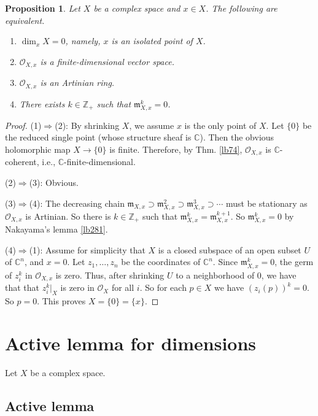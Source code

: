 \documentclass[12pt,b5paper,notitlepage]{report}
\theoremstyle{definition}
\theoremstyle{plain}
\newtheorem{pp}[df]{Proposition}
\newcommand{\scr}{\mathscr}
\newcommand{\Cbb}{\mathbb C}
\newcommand{\Zbb}{\mathbb Z}
\newcommand{\mk}{\mathfrak m}
\numberwithin{equation}{section}
\begin{document}
\begin{pp}\label{lb301}
Let $X$ be a complex space and $x\in X$. The following are equivalent.
\begin{enumerate}[label=(\arabic*)]
\item $\dim_xX=0$, namely, $x$ is an isolated point of $X$.
\item $\scr O_{X,x}$ is a finite-dimensional vector space.
\item $\scr O_{X,x}$ is an Artinian ring.
\item There exists $k\in\Zbb_+$ such that $\mk_{X,x}^k=0$.
\end{enumerate}
\end{pp}


\begin{proof}
(1)$\Rightarrow$(2): By shrinking $X$, we assume $x$ is the only point of $X$. Let $\{0\}$ be the reduced single point (whose structure sheaf is $\Cbb$). Then the obvious holomorphic map $X\rightarrow\{0\}$ is finite. Therefore, by Thm. \ref{lb74}, $\scr O_{X,x}$ is $\Cbb$-coherent, i.e., $\Cbb$-finite-dimensional.

(2)$\Rightarrow$(3): Obvious.


(3)$\Rightarrow$(4): The decreasing chain $\mk_{X,x}\supset\mk_{X,x}^2\supset\mk_{X,x}^3\supset\cdots$ must be stationary as $\scr O_{X,x}$ is Artinian. So there is $k\in\Zbb_+$ such that $\mk_{X,x}^k=\mk_{X,x}^{k+1}$. So $\mk_{X,x}^k=0$ by Nakayama's lemma \ref{lb281}.

(4)$\Rightarrow$(1): Assume for simplicity that $X$ is a closed subspace of an open subset $U$ of $\Cbb^n$, and $x=0$. Let $z_1,\dots,z_n$ be the coordinates of $\Cbb^n$. Since $\mk_{X,x}^k=0$, the germ of $z_i^k$ in $\scr O_{X,x}$ is zero. Thus, after shrinking $U$ to a neighborhood of $0$, we have that that $z_i^k|_X$ is zero in $\scr O_X$ for all $i$. So for each $p\in X$ we have $(z_i(p))^k=0$. So $p=0$. This proves $X=\{0\}=\{x\}$.
\end{proof}




\section{Active lemma for dimensions}


Let $X$ be a complex space.

\subsection{Active lemma}
\end{document}
